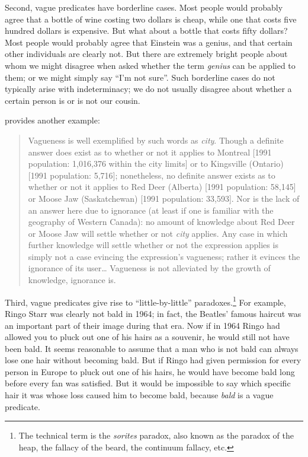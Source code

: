 Second, vague predicates have borderline cases. Most people would probably agree that a bottle of wine costing two dollars is cheap, while one that costs five hundred dollars is expensive. But what about a bottle that costs fifty dollars? Most people would probably agree that Einstein was a genius, and that certain other individuals are clearly not. But there are extremely bright people about whom we might disagree when asked whether the term \textit{genius} can be applied to them; or we might simply say “I’m not sure”. Such borderline cases do not typically arise with indeterminacy; we do not usually disagree about whether a certain person is or is not our cousin.



\citet{Gillon1990} provides another example:


\begin{quote}
Vagueness is well exemplified by such words as \textit{city}. Though a definite answer does exist as to whether or not it applies to Montreal [1991 population: 1,016,376 within the city limits] or to Kingsville (Ontario) [1991 population: 5,716]; nonetheless, no definite answer exists as to whether or not it applies to Red Deer (Alberta) [1991 population: 58,145] or Moose Jaw (Saskatchewan) [1991 population: 33,593]. Nor is the lack of an answer here due to ignorance (at least if one is familiar with the geography of Western Canada): no amount of knowledge about Red Deer or Moose Jaw will settle whether or not \textit{city} applies. Any case in which further knowledge will settle whether or not the expression applies is simply not a case evincing the expression’s vagueness; rather it evinces the ignorance of its user… Vagueness is not alleviated by the growth of knowledge, ignorance is.
\end{quote}


Third, vague predicates give rise to “little-by-little” paradoxes.\footnote{The technical term is the \textit{sorites} paradox, also known as the paradox of the heap, the fallacy of the beard, the continuum fallacy, etc.} For example, Ringo Starr was clearly not bald in 1964; in fact, the Beatles’ famous haircut was an important part of their image during that era. Now if in 1964 Ringo had allowed you to pluck out one of his hairs as a souvenir, he would still not have been bald. It seems reasonable to assume that a man who is not bald can always lose one hair without becoming bald. But if Ringo had given permission for every person in Europe to pluck out one of his hairs, he would have become bald long before every fan was satisfied. But it would be impossible to say which specific hair it was whose loss caused him to become bald, because \textit{bald} is a vague predicate.



